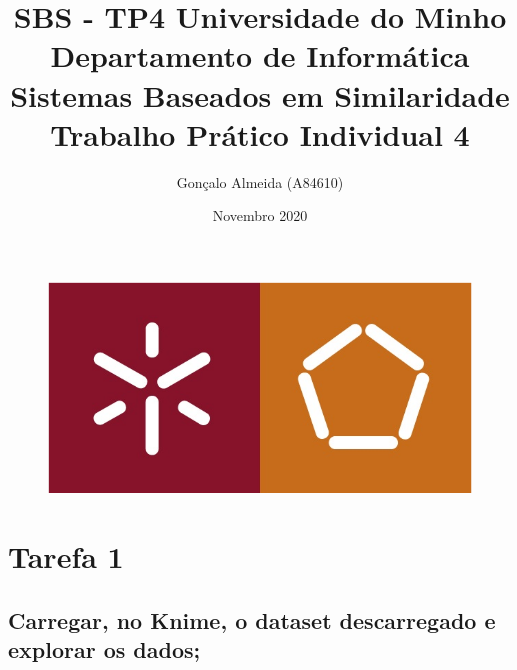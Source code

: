 \documentclass{article}
\title{SBS - TP4}
\author{Gonçalo Almeida (A84610)}
\date{Novembro 2020}
\begin{document}
\begin{figure}[t]
    \centering
    \includegraphics[scale=0.4]{Images/MIEI_logo.png}
\end{figure}

\title{
    \textbf{
        Universidade do Minho \\
        Departamento de Informática \\
        \vspace{1.5cm}
        Sistemas Baseados em Similaridade \\
        \vspace{1cm}
        Trabalho Prático Individual 4}
        \vspace{4cm}}

\maketitle

\clearpage

\section{Tarefa 1}

\subsection{Carregar, no Knime, o dataset descarregado e explorar os dados;}
\end{document}

